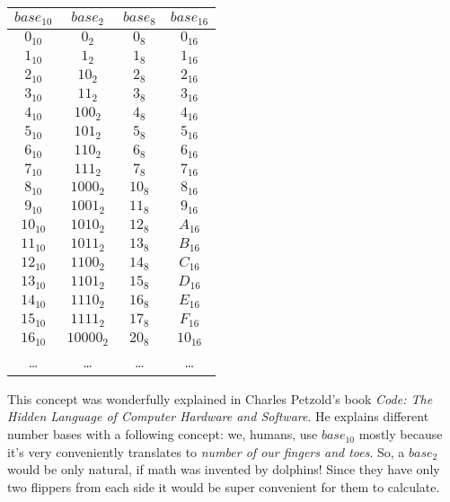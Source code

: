 \documentclass{article}
\begin{document}
            \begin{center}
                \begin{longtable}{|c|c|c|c|}
                    \hline
                    $base_{10}$ & $base_2$ & $base_8$ & $base_{16}$ \\\hline
                    $0_{10}$ & $0_2$ & $0_8$ & $0_{16}$ \\\hline
                    $1_{10}$ & $1_2$ & $1_8$ & $1_{16}$ \\\hline
                    $2_{10}$ & $10_2$ & $2_8$ & $2_{16}$ \\\hline
                    $3_{10}$ & $11_2$ & $3_8$ & $3_{16}$ \\\hline
                    $4_{10}$ & $100_2$ & $4_8$ & $4_{16}$ \\\hline
                    $5_{10}$ & $101_2$ & $5_8$ & $5_{16}$ \\\hline
                    $6_{10}$ & $110_2$ & $6_8$ & $6_{16}$ \\\hline
                    $7_{10}$ & $111_2$ & $7_8$ & $7_{16}$ \\\hline
                    $8_{10}$ & $1000_2$ & $10_8$ & $8_{16}$ \\\hline
                    $9_{10}$ & $1001_2$ & $11_8$ & $9_{16}$ \\\hline
                    $10_{10}$ & $1010_2$ & $12_8$ & $A_{16}$ \\\hline
                    $11_{10}$ & $1011_2$ & $13_8$ & $B_{16}$ \\\hline 
                    $12_{10}$ & $1100_2$ & $14_8$ & $C_{16}$ \\\hline
                    $13_{10}$ & $1101_2$ & $15_8$ & $D_{16}$ \\\hline
                    $14_{10}$ & $1110_2$ & $16_8$ & $E_{16}$ \\\hline
                    $15_{10}$ & $1111_2$ & $17_8$ & $F_{16}$ \\\hline
                    $16_{10}$ & $10000_2$ & $20_8$ & $10_{16}$ \\\hline 
                    \ldots & \ldots & \ldots & \ldots \\\hline
                \end{longtable}
            \end{center}


            This concept was wonderfully explained in Charles Petzold's book \emph{Code: The Hidden Language of Computer Hardware and Software}. He explains different
            number bases with a following concept: we, humans, use $base_{10}$ mostly because it's very conveniently translates to \emph{number of our fingers and toes}.
            So, a $base_2$ would be only natural, if math was invented by dolphins! Since they have only two flippers from each side it would be super convenient for
            them to calculate. \par
    
\end{document}
